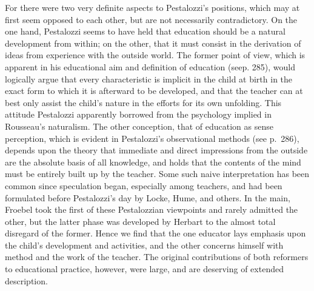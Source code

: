 \documentclass[]{book}
\begin{document}
For there were two very definite aspects to Pestalozzi's positions, which may at first seem opposed to each other, but are not necessarily contradictory. On the one hand, Pestalozzi seems to have held that education should be a natural development from within; on the other, that it must consist in the derivation of ideas from experience with the outside world. The former point of view, which is apparent in his educational aim and definition of education (seep. 285), would logically argue that every characteristic is implicit in the child at birth in the exact form to which it is afterward to be developed, and that the teacher can at best only assist the child's nature in the efforts for its own unfolding. This attitude Pestalozzi apparently borrowed from the psychology implied in Rousseau's naturalism. The other conception, that of education as sense perception, which is evident in Pestalozzi's observational methods (see p.~286), depends upon the theory that immediate and direct impressions from the outside are the absolute basis of all knowledge, and holds that the contents of the mind must be entirely built up by the teacher. Some such naive interpretation has been common since speculation began, especially among teachers, and had been formulated before Pestalozzi's day by Locke, Hume, and others. In the main, Froebel took the first of these Pestalozzian viewpoints and rarely admitted the other, but the latter phase was developed by Herbart to the almost total disregard of the former. Hence we find that the one educator lays emphasis upon the child's development and activities, and the other concerns himself with method and the work of the teacher. The original contributions of both reformers to educational practice, however, were large, and are deserving of extended description.
\end{document}
